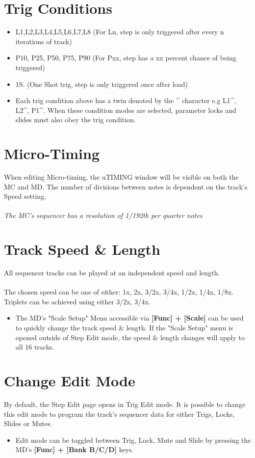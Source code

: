 \section{Trig Conditions}
\begin{itemize}
\item L1,L2,L3,L4,L5,L6,L7,L8 (For Ln, step is only triggered after every n iterations of track)
\item P10, P25, P50, P75, P90 (For Pxx, step has a xx percent chance of being triggered)
\item 1S. (One Shot trig, step is only triggered once after load)
\item Each trig condition above has a twin denoted by the \^{} character e.g L1\^{}, L2\^{}, P1\^{}. When these condition modes are selected, parameter locks and slides must also obey the trig condition.
\end{itemize}
\section{Micro-Timing}
When editing Micro-timing, the uTIMING window will be visible on both the MC and MD. The number of divisions between notes is dependent on the track's Speed setting.\\\\\textit{The MC's sequencer has a resolution of 1/192th per quarter notes}\\
\section{Track Speed \& Length}
All sequencer tracks can be played at an independent speed and length.\\\\
The chosen speed can be one of either: 1x, 2x, 3/2x, 3/4x, 1/2x, 1/4x, 1/8x.\\Triplets can be achieved using either 3/2x, 3/4x.
\begin{itemize}
\item The MD's "Scale Setup" Menu accessible via \textbf{[Func] + [Scale]} can be used to quickly change the track speed \& length. If the "Scale Setup" menu is opened outside of Step Edit mode, the speed \& length changes will apply to all 16 tracks.
\end{itemize}
\newpage
\section{Change Edit Mode}
By default, the Step Edit page opens in Trig Edit mode. It is possible to change this edit mode to program the track's sequencer data for either Trigs, Locks, Slides or Mutes.
\begin{itemize}
\item Edit mode can be toggled between Trig, Lock, Mute and Slide by pressing the MD's \textbf{[Func] + [Bank B/C/D]} keys.
\end{itemize}

